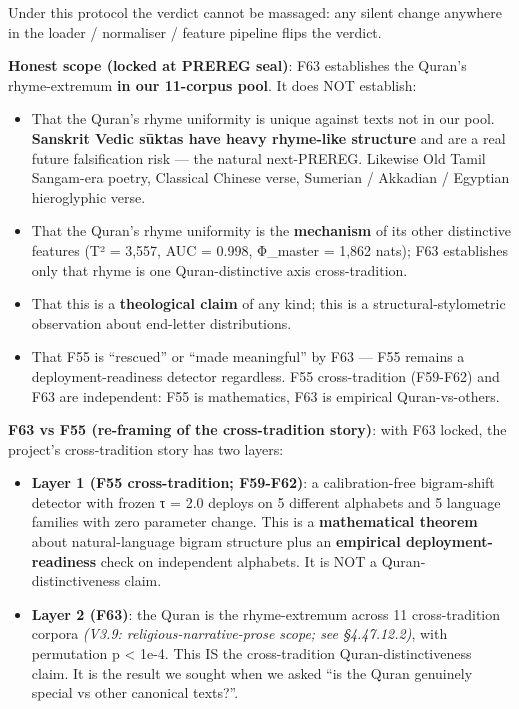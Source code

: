 \documentclass[
]{article}
\providecommand{\tightlist}{%
  \setlength{\itemsep}{0pt}\setlength{\parskip}{0pt}}
\begin{document}
Under this protocol the verdict cannot be massaged: any silent change
anywhere in the loader / normaliser / feature pipeline flips the
verdict.

\textbf{Honest scope (locked at PREREG seal)}: F63 establishes the
Quran's rhyme-extremum \textbf{in our 11-corpus pool}. It does NOT
establish:

\begin{itemize}
\tightlist
\item
  That the Quran's rhyme uniformity is unique against texts not in our
  pool. \textbf{Sanskrit Vedic sūktas have heavy rhyme-like structure}
  and are a real future falsification risk --- the natural next-PREREG.
  Likewise Old Tamil Sangam-era poetry, Classical Chinese verse,
  Sumerian / Akkadian / Egyptian hieroglyphic verse.
\item
  That the Quran's rhyme uniformity is the \textbf{mechanism} of its
  other distinctive features (T² = 3,557, AUC = 0.998, Φ\_master = 1,862
  nats); F63 establishes only that rhyme is one Quran-distinctive axis
  cross-tradition.
\item
  That this is a \textbf{theological claim} of any kind; this is a
  structural-stylometric observation about end-letter distributions.
\item
  That F55 is ``rescued'' or ``made meaningful'' by F63 --- F55 remains
  a deployment-readiness detector regardless. F55 cross-tradition
  (F59-F62) and F63 are independent: F55 is mathematics, F63 is
  empirical Quran-vs-others.
\end{itemize}

\textbf{F63 vs F55 (re-framing of the cross-tradition story)}: with F63
locked, the project's cross-tradition story has two layers:

\begin{itemize}
\tightlist
\item
  \textbf{Layer 1 (F55 cross-tradition; F59-F62)}: a calibration-free
  bigram-shift detector with frozen τ = 2.0 deploys on 5 different
  alphabets and 5 language families with zero parameter change. This is
  a \textbf{mathematical theorem} about natural-language bigram
  structure plus an \textbf{empirical deployment-readiness} check on
  independent alphabets. It is NOT a Quran-distinctiveness claim.
\item
  \textbf{Layer 2 (F63)}: the Quran is the rhyme-extremum across 11
  cross-tradition corpora \emph{(V3.9: religious-narrative-prose scope;
  see §4.47.12.2)}, with permutation p \textless{} 1e-4. This IS the
  cross-tradition Quran-distinctiveness claim. It is the result we
  sought when we asked ``is the Quran genuinely special vs other
  canonical texts?''.
\end{itemize}
\end{document}
